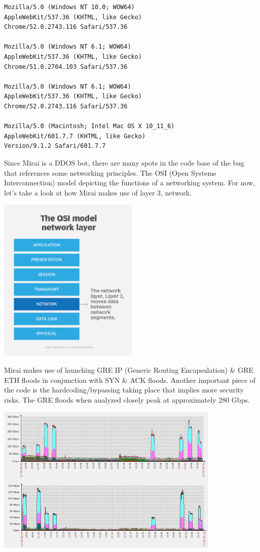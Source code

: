 \documentclass[12pt, letterpaper]{article}
\begin{document}
\begin{sloppypar}
\begin{flushleft}
\begin{verbatim}
Mozilla/5.0 (Windows NT 10.0; WOW64) 
AppleWebKit/537.36 (KHTML, like Gecko) 
Chrome/52.0.2743.116 Safari/537.36

Mozilla/5.0 (Windows NT 6.1; WOW64) 
AppleWebKit/537.36 (KHTML, like Gecko) 
Chrome/51.0.2704.103 Safari/537.36

Mozilla/5.0 (Windows NT 6.1; WOW64) 
AppleWebKit/537.36 (KHTML, like Gecko) 
Chrome/52.0.2743.116 Safari/537.36

Mozilla/5.0 (Macintosh; Intel Mac OS X 10_11_6) 
AppleWebKit/601.7.7 (KHTML, like Gecko) 
Version/9.1.2 Safari/601.7.7
\end{verbatim}


Since Mirai is a DDOS bot, there are many spots in the code base of the bug that 
references some networking principles. The OSI (Open Systems Interconnection) model 
depicting the functions of a networking system. For now, let's take a look at how
Mirai makes use of layer 3, network. 
\begin{center}
{\includegraphics[width=0.5\textwidth]{osi-networking.png}}
\end{center}

Mirai makes use of launching GRE IP (Generic Routing Encapsulation) \& GRE ETH floods
in conjunction with SYN \& ACK floods. Another important piece of the code is the 
hardcoding/bypassing taking place that implies more security risks. The GRE floods
when analyzed closely peak at approximately 280 Gbps.

\begin{center}
{\includegraphics[width=0.8\textwidth]{mirai-bandwidth.png}}
\end{center}


\end{flushleft}
\end{sloppypar}
\end{document}
